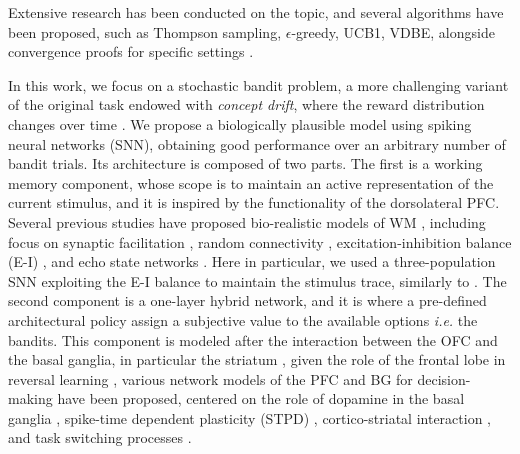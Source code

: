 Extensive research has been conducted on the topic, and several algorithms have been proposed, such as Thompson sampling, $\epsilon$-greedy, UCB1, VDBE, alongside convergence proofs for specific settings \cite{gittinsBanditProcessesDynamic1979, kaufmannThompsonSamplingAsymptotically2012, banMultifacetContextualBandits2021, tokicAdaptiveEGreedyExploration2010, tokicValueDifferenceBasedExploration2011}.

In this work, we focus on a stochastic bandit problem, a more challenging variant of the original task endowed with \textit{concept drift}, where the reward distribution changes over time \cite{garivierUpperConfidenceBoundPolicies2008, besbesStochasticMultiArmedBanditProblem2014, cavenaghiNonStationaryMultiArmed2021}.
We propose a biologically plausible model using spiking neural networks (SNN), obtaining good performance over an arbitrary number of bandit trials.
Its architecture is composed of two parts. The first is a working memory component, whose scope is to maintain an active representation of the current stimulus, and it is inspired by the functionality of the dorsolateral PFC. Several previous studies have proposed bio-realistic models of WM
\cite{barakWorkingModelsWorking2014}, including focus on synaptic facilitation \cite{barakNeuronalPopulationCoding2010}, random connectivity \cite{bouchacourtFlexibleModelWorking2019}, excitation-inhibition balance (E-I)
\cite{brunelEffectsNeuromodulationCortical2001, vogelsGatingMultipleSignals2009}, and echo state networks \cite{pascanuNeurodynamicalModelWorking2011, fetteShortTermMemory2005}. Here in particular, we used a three-population SNN exploiting the E-I balance to maintain the stimulus trace, similarly to
\cite{chenSpikingNeuralNetwork2023}.
The second component is a one-layer hybrid network, and it is where a pre-defined architectural policy assign a subjective value to the available options \textit{i.e.} the bandits.
This component is modeled after the interaction between the OFC and the basal ganglia, in particular the striatum
\cite{bariDynamicDecisionMaking2021, frankAnatomyDecisionStriatoorbitofrontal2006}, given the role of the frontal lobe in reversal learning \cite{bartoloPrefrontalCortexPredicts2020},
various network models of the PFC and BG for decision-making have been proposed, centered on the role of dopamine in the basal ganglia \cite{bastonBiologicallyInspiredComputational2015}, spike-time dependent plasticity (STPD) \cite{kannanUnsupervisedSpikingNeural2023}, cortico-striatal interaction
\cite{frankInteractionsFrontalCortex2001}, and task switching processes \cite{zhaoBrainInspiredDecisionMakingSpiking2018, herdNeuralNetworkModel2014}.

